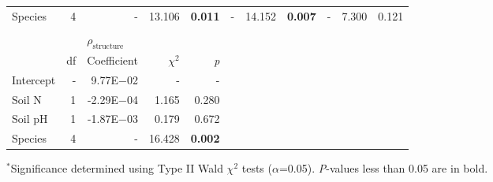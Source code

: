 \begin{landscape}
\begin{table}
{\begin{tabular}{p{2.5cm}p{0.5cm}p{2cm}p{1.5cm}p{1.5cm}p{2cm}p{1.5cm}p{1.5cm}p{2cm}p{1.5cm}p{1.5cm}}
        Species & \multicolumn{1}{r}{4}
        & \multicolumn{1}{r}{-} & \multicolumn{1}{r}{13.106} & \multicolumn{1}{r}{\textbf{0.011}}
        & \multicolumn{1}{r}{-} & \multicolumn{1}{r}{14.152} & \multicolumn{1}{r}{\textbf{0.007}}
        & \multicolumn{1}{r}{-} & \multicolumn{1}{r}{7.300} & \multicolumn{1}{r}{0.121}
        \\

        &&&&&&&&&&
        \\

        && \multicolumn{3}{l}{$\rho_\mathrm{structure}$} &&&&& \\
        \hline
        & \multicolumn{1}{r}{df}
        & \multicolumn{1}{r}{Coefficient} & \multicolumn{1}{r}{$\chi^{2}$} & \multicolumn{1}{r}{\textit{p}} 
        \\
        \hline

        Intercept & \multicolumn{1}{r}{-}
        & \multicolumn{1}{r}{9.77E$-$02} & \multicolumn{1}{r}{-} & \multicolumn{1}{r}{-}
        &&&&&&
        \\

        Soil N & \multicolumn{1}{r}{1}
        & \multicolumn{1}{r}{-2.29E$-$04}  & \multicolumn{1}{r}{1.165} & \multicolumn{1}{r}{0.280}
        &&&&&& 
        \\

        Soil pH & \multicolumn{1}{r}{1}
        & \multicolumn{1}{r}{-1.87E$-$03} & \multicolumn{1}{r}{0.179} & \multicolumn{1}{r}{0.672}
        &&&&&& 
        \\

        Species & \multicolumn{1}{r}{4}
        & \multicolumn{1}{r}{-} & \multicolumn{1}{r}{16.428} & \multicolumn{1}{r}{\textbf{0.002}}
        &&&&&&
        \\
        \hline
    \end{tabular}}
    \label{tab:table3.3}
\end{table}
\begin{singlespace}
    \noindent $^*$Significance determined using Type II Wald $\chi^{2}$ tests ($\alpha$=0.05). \textit{P}-values less than 0.05 are in bold. 
\end{singlespace}
\end{landscape}
\clearpage

